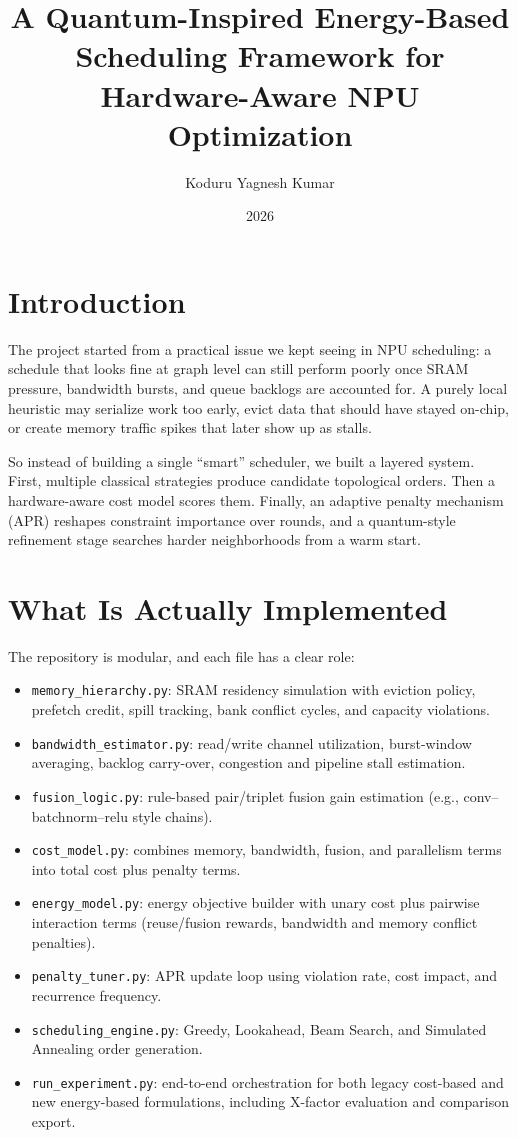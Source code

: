 \documentclass[11pt]{article}
\title{A Quantum-Inspired Energy-Based Scheduling Framework for Hardware-Aware NPU Optimization}
\author{Koduru Yagnesh Kumar}
\date{2026}
\begin{document}
\maketitle

\section{Introduction}
The project started from a practical issue we kept seeing in NPU scheduling: a schedule that looks fine at graph level can still perform poorly once SRAM pressure, bandwidth bursts, and queue backlogs are accounted for. A purely local heuristic may serialize work too early, evict data that should have stayed on-chip, or create memory traffic spikes that later show up as stalls.

So instead of building a single ``smart'' scheduler, we built a layered system. First, multiple classical strategies produce candidate topological orders. Then a hardware-aware cost model scores them. Finally, an adaptive penalty mechanism (APR) reshapes constraint importance over rounds, and a quantum-style refinement stage searches harder neighborhoods from a warm start.

\section{What Is Actually Implemented}
The repository is modular, and each file has a clear role:
\begin{itemize}
    \item \texttt{memory\_hierarchy.py}: SRAM residency simulation with eviction policy, prefetch credit, spill tracking, bank conflict cycles, and capacity violations.
    \item \texttt{bandwidth\_estimator.py}: read/write channel utilization, burst-window averaging, backlog carry-over, congestion and pipeline stall estimation.
    \item \texttt{fusion\_logic.py}: rule-based pair/triplet fusion gain estimation (e.g., conv--batchnorm--relu style chains).
    \item \texttt{cost\_model.py}: combines memory, bandwidth, fusion, and parallelism terms into total cost plus penalty terms.
    \item \texttt{energy\_model.py}: energy objective builder with unary cost plus pairwise interaction terms (reuse/fusion rewards, bandwidth and memory conflict penalties).
    \item \texttt{penalty\_tuner.py}: APR update loop using violation rate, cost impact, and recurrence frequency.
    \item \texttt{scheduling\_engine.py}: Greedy, Lookahead, Beam Search, and Simulated Annealing order generation.
    \item \texttt{run\_experiment.py}: end-to-end orchestration for both legacy cost-based and new energy-based formulations, including X-factor evaluation and comparison export.
\end{itemize}
\end{document}
